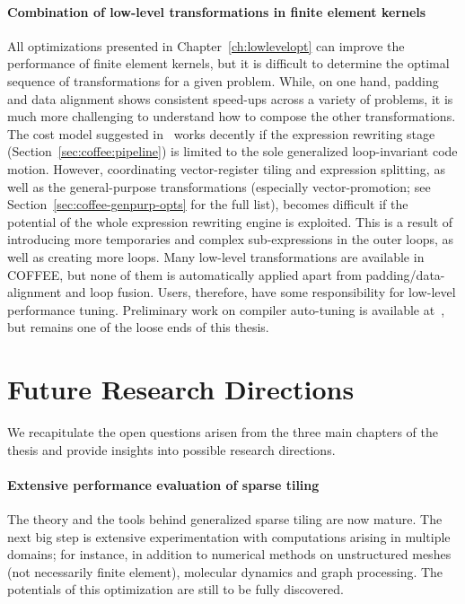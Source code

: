 \paragraph{Combination of low-level transformations in finite element kernels}
All optimizations presented in Chapter~\ref{ch:lowlevelopt} can improve the performance of finite element kernels, but it is difficult to determine the optimal sequence of transformations for a given problem. While, on one hand, padding and data alignment shows consistent speed-ups across a variety of problems, it is much more challenging to understand how to compose the other transformations. The cost model suggested in~\cite{Luporini-coffee} works decently if the expression rewriting stage (Section~\ref{sec:coffee:pipeline}) is limited to the sole generalized loop-invariant code motion. However, coordinating vector-register tiling and expression splitting, as well as the general-purpose transformations (especially vector-promotion; see Section~\ref{sec:coffee-genpurp-opts} for the full list), becomes difficult if the potential of the whole expression rewriting engine is exploited. This is a result of introducing more temporaries and complex sub-expressions in the outer loops, as well as creating more loops. Many low-level transformations are available in COFFEE, but none of them is automatically applied apart from padding/data-alignment and loop fusion. Users, therefore, have some responsibility for low-level performance tuning. Preliminary work on compiler auto-tuning is available at~\citep{coffee-code}, but remains one of the loose ends of this thesis.


\section{Future Research Directions}
We recapitulate the open questions arisen from the three main chapters of the thesis and provide insights into possible research directions. 

\paragraph{Extensive performance evaluation of sparse tiling}
The theory and the tools behind generalized sparse tiling are now mature. The next big step is extensive experimentation with computations arising in multiple domains; for instance, in addition to numerical methods on unstructured meshes (not necessarily finite element), molecular dynamics and graph processing. The potentials of this optimization are still to be fully discovered. 

